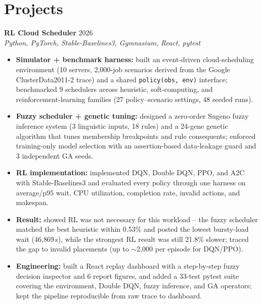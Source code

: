 %
%


\section*{Projects}
\textbf{RL Cloud Scheduler} \hfill 2026\\
\textit{Python, PyTorch, Stable-Baselines3, Gymnasium, React, pytest}
\begin{itemize}
  \item \textbf{Simulator + benchmark harness:} built an event-driven
        cloud-scheduling environment (10 servers, 2{,}000-job scenarios derived
        from the Google ClusterData2011-2 trace) and a shared
        \texttt{policy(obs, env)} interface; benchmarked 9 schedulers across
        heuristic, soft-computing, and reinforcement-learning families
        (27 policy--scenario settings, 48 seeded runs).

  \item \textbf{Fuzzy scheduler + genetic tuning:} designed a zero-order Sugeno
        fuzzy inference system (3 linguistic inputs, 18 rules) and a 24-gene
        genetic algorithm that tunes membership breakpoints and rule
        consequents; enforced training-only model selection with an
        assertion-based data-leakage guard and 3 independent GA seeds.

  \item \textbf{RL implementation:} implemented DQN, Double DQN, PPO, and A2C
        with Stable-Baselines3 and evaluated every policy through one harness
        on average/p95 wait, CPU utilization, completion rate, invalid actions,
        and makespan.

  \item \textbf{Result:} showed RL was not necessary for this workload -- the
        fuzzy scheduler matched the best heuristic within 0.53\% and posted the
        lowest bursty-load wait (46{,}869\,s), while the strongest RL result was
        still 21.8\% slower; traced the gap to invalid placements (up to
        $\sim$2{,}000 per episode for DQN/PPO).

  \item \textbf{Engineering:} built a React replay dashboard with a step-by-step
        fuzzy decision inspector and 6 report figures, and added a 33-test
        pytest suite covering the environment, Double DQN, fuzzy inference, and
        GA operators; kept the pipeline reproducible from raw trace to dashboard.
\end{itemize}


